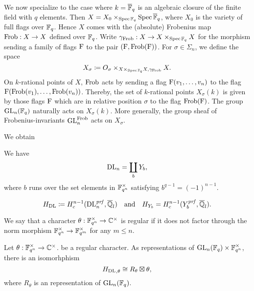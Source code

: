 \documentclass[../main.tex]{subfiles}
\begin{document}
We now specialize to the case where $k = \overline {\mathbb{F}}_q$ is an algebraic closure of 
the finite field with $q$ elements. Then $X = X_0 \times_{\operatorname{Spec} \mathbb{F}_q} \operatorname{Spec} \overline {\mathbb{F}}_q$,
where $X_0$ is the variety of full flags over $\mathbb{F}_q$. Hence $X$ comes with
the (absolute) Frobenius map $\mathrm{Frob}: X \to X$ defined over $\mathbb{F}_q$. 
Write $\gamma_{\mathrm{Frob}}: X \to X \times_{\operatorname{Spec} \mathbb{F}_q} X$ for the morphism sending
a family of flags $\mathrm{F}$ to the pair $(\mathrm{F}, \mathrm{Frob} (\mathrm{F}))$. 
For $\sigma \in \Sigma_n$, we define the space
\begin{equation*}
  X_\sigma \coloneqq O_\sigma \times_{X \times_{\operatorname{Spec} \mathbb{F}_q}X, \gamma_{\mathrm{Frob}}} X.
\end{equation*}
On $k$-rational points of $X$, $\mathrm{Frob}$ acts by sending a flag $\mathrm{F}(v_1,
\dots, \allowbreak v_n)$
to the flag $\mathrm{F}(\mathrm{Frob}(v_1), \dots, \allowbreak \mathrm{Frob}(v_n))$. Thereby, the
set of $k$-rational points $X_\sigma(k)$ is given by those flags $\mathrm{F}$ which
are in relative position $\sigma$ to the flag $\mathrm{Frob}(\mathrm{F})$. The group
$\operatorname{GL}_n(\mathbb{F}_q)$ naturally acts on $X_\sigma(k)$. More generally, the group sheaf
of Frobenius-invariants $\operatorname{GL}_n^{\mathrm{Frob}}$ acts on $X_\sigma$. 

We obtain 


\begin{defi}\label{def:DLVariety}
  \todo{}
\end{defi}

\begin{lem}
  We have $$\mathrm{DL}_n = \coprod_{b} Y_b,$$
  where $b$ runs over the set elements in $\mathbb{F}_{q^n}^\times$ satisfying 
  $b^{q-1} = (-1)^{n-1}$. 
\end{lem}

\begin{equation} \label{eq:defDLCohom}
  H_\mathrm{DL} \coloneqq H^{n-1}_c(\mathrm{DL}_n^{\mathit{prf}}, \overline {\mathbb{Q}}_l) \quad \text{and} \quad
  H_{Y_b} = H^{n-1}_c(Y_b^{\mathit{prf}}, \overline {\mathbb{Q}}_l).
\end{equation}

\begin{defi}
  We say that a character $\theta: \mathbb{F}_{q^n}^\times \to \mathbb{C}^\times$ is 
  regular if it does not factor through the norm morphism
  $\mathbb{F}_{q^n}^\times \to \mathbb{F}_{q^m}^\times$ for any $m \leq n$.
\end{defi}

\begin{prop} \label{prop:DLCorrespondence}
  Let $\theta: \mathbb{F}_{q^n}^\times \to \mathbb{C}^\times$. be a regular character.
  As representations of $\operatorname{GL}_n(\mathbb{F}_q) \times \mathbb{F}_{q^n}^\times$, there is an
  isomorhphism 
  \begin{equation*}
    {H_\mathrm{DL}}_{, \theta} \cong  R_\theta \boxtimes \theta,
  \end{equation*}
  where $R_\theta$ is an  representation of $\operatorname{GL}_n(\mathbb{F}_q)$. 
\end{prop}
\end{document}
